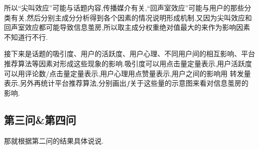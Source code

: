 \documentclass[12pt,a4paper,oneside]{ctexart}
\begin{document}
所以``尖叫效应''可能与话题内容,传播媒介有关,``回声室效应''可能与用户的那些分类有关,然后分别主成分分析得到各个因素的情况说明形成机制.又因为尖叫效应和
回声室效应都可能导致信息茧房,所以取主成分权重绝对值最大的来作为影响因素不知道行不行.

接下来是话题的吸引度、用户的活跃度、用户心理、不同用户间的相互影响、平台推荐算法等因素对形成这些现象的影响.吸引度可以用点击量定量表示,用户活跃度可以用评论数/点击量定量表示,用户心理用点赞量表示,用户之间的影响用
转发量表示,另外再统计平台推荐算法,分别画出$f$关于这些量的示意图来看对信息茧房的影响.

\subsection*{第三问\&第四问}
那就根据第二问的结果具体说说.
\end{document}
